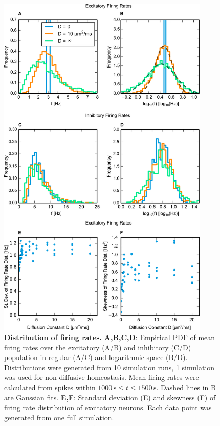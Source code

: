 \documentclass[10pt,letterpaper]{article}
\begin{document}
\begin{figure}
\begin{center}
\includegraphics[width=0.9\textwidth]{./figures/fir_rate_dist_comp.png}
\end{center}
\caption{{\bf Distribution of firing rates.} \textbf{A,B,C,D}: Empirical PDF of mean firing rates over the excitatory (A/B) and inhibitory (C/D) population in regular (A/C) and logarithmic space (B/D). Distributions were generated from 10 simulation runs, 1 simulation was used for non-diffusive homeostasis. Mean firing rates were calculated from spikes within $\mathrm{1000\,s} \leq t  \mathrm{\leq 1500\,s}$. Dashed lines in B are Gaussian fits. \textbf{E,F}: Standard deviation (E) and skewness (F) of firing rate distribution of excitatory neurons. Each data point was generated from one full simulation.}
\label{Fir_Rate_Dist_Comp}
\end{figure}
\end{document}
